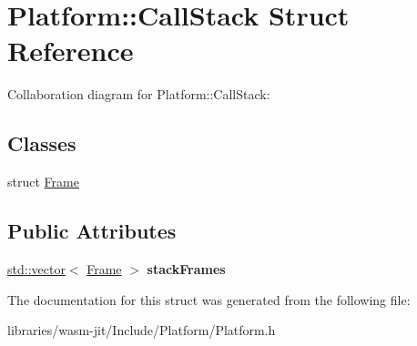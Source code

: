 \hypertarget{struct_platform_1_1_call_stack}{}\section{Platform\+:\+:Call\+Stack Struct Reference}
\label{struct_platform_1_1_call_stack}


Collaboration diagram for Platform\+:\+:Call\+Stack\+:
\subsection*{Classes}
\begin{DoxyCompactItemize}
\item 
struct \mbox{\hyperlink{struct_platform_1_1_call_stack_1_1_frame}{Frame}}
\end{DoxyCompactItemize}
\subsection*{Public Attributes}
\begin{DoxyCompactItemize}
\item 
\mbox{\label{struct_platform_1_1_call_stack_adb6221edf2760f5d27eb70a5658b4b79}} 
\mbox{\hyperlink{classstd_1_1vector}{std\+::vector}}$<$ \mbox{\hyperlink{struct_platform_1_1_call_stack_1_1_frame}{Frame}} $>$ {\bfseries stack\+Frames}
\end{DoxyCompactItemize}


The documentation for this struct was generated from the following file\+:\begin{DoxyCompactItemize}
\item 
libraries/wasm-\/jit/\+Include/\+Platform/Platform.\+h\end{DoxyCompactItemize}
